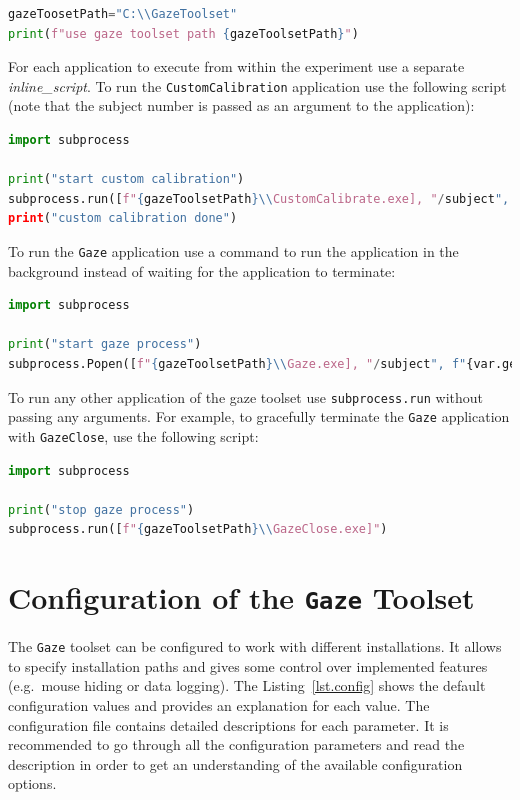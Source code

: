 \documentclass[a4paper,oneside]{book}
\begin{document}
\begin{lstlisting}[language=Python]
gazeToosetPath="C:\\GazeToolset"
print(f"use gaze toolset path {gazeToolsetPath}")
\end{lstlisting}

For each application to execute from within the experiment use a separate \emph{inline\_script}.
To run the \texttt{CustomCalibration} application use the following script (note that the subject number is passed as an argument to the application):

\begin{lstlisting}[language=Python]
import subprocess

print("start custom calibration")
subprocess.run([f"{gazeToolsetPath}\\CustomCalibrate.exe], "/subject", f"{var.get(u'subject_nr')}")
print("custom calibration done")
\end{lstlisting}

To run the \texttt{Gaze} application use a command to run the application in the background instead of waiting for the application to terminate:

\begin{lstlisting}[language=Python]
import subprocess

print("start gaze process")
subprocess.Popen([f"{gazeToolsetPath}\\Gaze.exe], "/subject", f"{var.get(u'subject_nr')}")
\end{lstlisting}

To run any other application of the gaze toolset use \texttt{subprocess.run} without passing any arguments.
For example, to gracefully terminate the \texttt{Gaze} application with \texttt{GazeClose}, use the following script:

\begin{lstlisting}[language=Python]
import subprocess

print("stop gaze process")
subprocess.run([f"{gazeToolsetPath}\\GazeClose.exe]")
\end{lstlisting}


\chapter{Configuration of the \texttt{Gaze} Toolset}
\label{sec.config}
The \texttt{Gaze} toolset can be configured to work with different installations.
It allows to specify installation paths and gives some control over implemented features (e.g.~mouse hiding or data logging).
The Listing~\ref{lst.config} shows the default configuration values and provides an explanation for each value.
The configuration file contains detailed descriptions for each parameter.
It is recommended to go through all the configuration parameters and read the description in order to get an understanding of the available configuration options.
\end{document}

